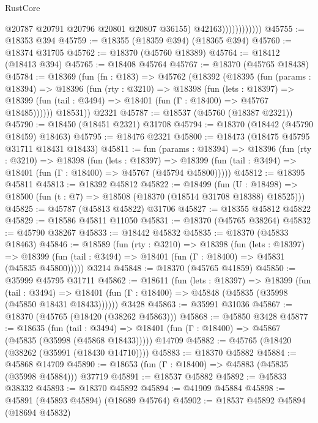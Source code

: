\begin{lexlean}{RustCore}
\begin{coremodule}
                              @20787
                              @20791
                              @20796
                              @20801
                              @20807
                              @36155)
                            @42163))))))))))))
@45755 := @18353 @394
@45759 := @18355 (@18359 @394) (@18365 @394)
@45760 := @18374 @31705
@45762 := @18370 (@45760 @18389)
@45764 := @18412 (@18413 @394)
@45765 := @18408 @45764
@45767 := @18370 (@45765 @18438)
@45784 := @18369
    (fun (fn : @183) =>
    @45762
      (@18392
        (@18395
          (fun (params : @18394) =>
          @18396
            (fun (rty : @3210) =>
            @18398
              (fun (lets : @18397) =>
              @18399 (fun (tail : @3494) => @18401 (fun (Γ : @18400) => @45767 @18485))))))
        @18531))
    @2321
@45787 := @18537 (@45760 (@18387 @2321))
@45790 := @18450 (@18451 @2321) @31708
@45794 := @18370 (@18442 (@45790 @18459) @18463)
@45795 := @18476 @2321
@45800 := @18473 (@18475 @45795 @31711 @18431 @18433)
@45811 := fun (params : @18394) =>
  @18396
    (fun (rty : @3210) =>
    @18398
      (fun (lets : @18397) =>
      @18399 (fun (tail : @3494) => @18401 (fun (Γ : @18400) => @45767 (@45794 @45800)))))
@45812 := @18395 @45811
@45813 := @18392 @45812
@45822 := @18499
    (fun (U : @18498) => @18500 (fun (t : @7) => @18508 (@18370 (@18514 @31708 @18388) @18525)))
@45825 := @45787 (@45813 @45822) @31706
@45827 := @18355 @45812 @45822
@45829 := @18586 @45811 @11050
@45831 := @18370 (@45765 @38264)
@45832 := @45790 @38267
@45833 := @18442 @45832
@45835 := @18370 (@45833 @18463)
@45846 := @18589
    (fun (rty : @3210) =>
    @18398
      (fun (lets : @18397) =>
      @18399 (fun (tail : @3494) => @18401 (fun (Γ : @18400) => @45831 (@45835 @45800)))))
    @3214
@45848 := @18370 (@45765 @41859)
@45850 := @35999 @45795 @31711
@45862 := @18611
    (fun (lets : @18397) =>
    @18399
      (fun (tail : @3494) =>
      @18401 (fun (Γ : @18400) => @45848 (@45835 (@35998 (@45850 @18431 @18433))))))
    @3428
@45863 := @35991 @31036
@45867 := @18370 (@45765 (@18420 (@38262 @45863)))
@45868 := @45850 @3428
@45877 := @18635
    (fun (tail : @3494) => @18401 (fun (Γ : @18400) => @45867 (@45835 (@35998 (@45868 @18433)))))
    @14709
@45882 := @45765 (@18420 (@38262 (@35991 (@18430 @14710))))
@45883 := @18370 @45882
@45884 := @45868 @14709
@45890 := @18653 (fun (Γ : @18400) => @45883 (@45835 (@35998 @45884))) @37719
@45891 := @18537 @45882
@45892 := @45833 @38332
@45893 := @18370 @45892
@45894 := @41909 @45884
@45898 := @45891 (@45893 @45894) (@18689 @45764)
@45902 := @18537 @45892 @45894 (@18694 @45832)

\end{coremodule}
\end{lexlean}
